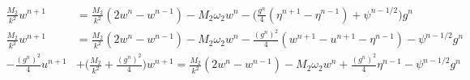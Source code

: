 \documentclass{article}
\begin{document}
\begin{align}
    \frac{M_2}{k^2}w^{n+1} &= \frac{M_2}{k^2}(2w^n-w^{n-1})-M_2\omega_2w^n-\Big(\frac{g^n}{4}(\eta^{n+1}-\eta^{n-1})+\psi^{n-1/2}\Big)g^n\nonumber\\
    \frac{M_2}{k^2}w^{n+1} &= \frac{M_2}{k^2}(2w^n-w^{n-1})-M_2\omega_2w^n-\frac{(g^n)^2}{4}(w^{n+1}-u^{n+1}-\eta^{n-1})-\psi^{n-1/2}g^n\nonumber\\
    - \frac{(g^n)^2}{4}u^{n+1} &+ \bigg(\frac{M_2}{k^2}+\frac{(g^n)^2}{4}\bigg)w^{n+1} = \frac{M_2}{k^2}(2w^n-w^{n-1})-M_2\omega_2w^n+\frac{(g^n)^2}{4}\eta^{n-1}-\psi^{n-1/2}g^n
\end{align}
\end{document}
